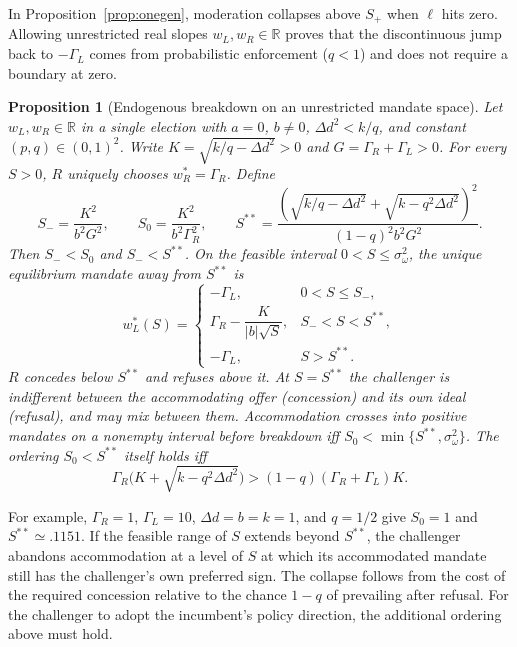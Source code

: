 \documentclass[11pt,letterpaper]{article}
\newtheorem{proposition}{Proposition}
\newcommand{\Dd}{\Delta d}
\begin{document}
In Proposition~\ref{prop:onegen}, moderation collapses above $S_+$ when $\ell$ hits zero. Allowing unrestricted real slopes $w_L,w_R\in\mathbb R$ proves that the discontinuous jump back to $-\Gamma_L$ comes from probabilistic enforcement ($q<1$) and does not require a boundary at zero.

\begin{proposition}[Endogenous breakdown on an unrestricted mandate space]\label{prop:unconstrained}
Let $w_L,w_R\in\mathbb R$ in a single election with $a=0$, $b\ne 0$, $\Dd^2<k/q$, and constant $(p,q)\in(0,1)^2$. Write $K=\sqrt{k/q-\Dd^2}>0$ and $G=\Gamma_R+\Gamma_L>0$. For every $S>0$, $R$ uniquely chooses $w_R^*=\Gamma_R$. Define
\[
 S_-=\frac{K^2}{b^2 G^2},\qquad
 S_0=\frac{K^2}{b^2\Gamma_R^2},\qquad
 S^{**}=\frac{\left(\sqrt{k/q-\Dd^2}+\sqrt{k-q^2\Dd^2}\right)^2}{(1-q)^2 b^2 G^2}.
\]
Then $S_-<S_0$ and $S_-<S^{**}$. On the feasible interval $0<S\le\sigma_\omega^2$, the unique equilibrium mandate away from $S^{**}$ is
\[
 w_L^*(S)=
 \begin{cases}
 -\Gamma_L, & 0<S\le S_-,\\
 \Gamma_R-\dfrac{K}{|b|\sqrt{S}}, & S_-<S<S^{**},\\
 -\Gamma_L, & S>S^{**}.
 \end{cases}
\]
$R$ concedes below $S^{**}$ and refuses above it. At $S=S^{**}$ the challenger is indifferent between the accommodating offer (concession) and its own ideal (refusal), and may mix between them. Accommodation crosses into positive mandates on a nonempty interval before breakdown iff $S_0<\min\{S^{**},\sigma_\omega^2\}$. The ordering $S_0<S^{**}$ itself holds iff
\[
 \Gamma_R\bigl(K+\sqrt{k-q^2\Dd^2}\bigr)>(1-q)(\Gamma_R+\Gamma_L)K.
\]
\end{proposition}
For example, $\Gamma_R=1$, $\Gamma_L=10$, $\Dd=b=k=1$, and $q=1/2$ give $S_0=1$ and $S^{**}\simeq .1151$. If the feasible range of $S$ extends beyond $S^{**}$, the challenger abandons accommodation at a level of $S$ at which its accommodated mandate still has the challenger's own preferred sign. The collapse follows from the cost of the required concession relative to the chance $1-q$ of prevailing after refusal. For the challenger to adopt the incumbent's policy direction, the additional ordering above must hold.
\end{document}
